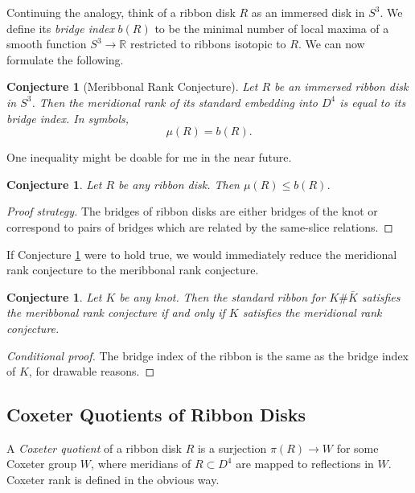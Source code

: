 \documentclass{article}
\newtheorem{conjecture}[theorem]{Conjecture}
\theoremstyle{definition}
\begin{document}
Continuing the analogy, think of a ribbon disk $R$ as an immersed disk in $S^3$. We define its \textit{bridge index} $b(R)$ to be the minimal number of local maxima of a smooth function $S^3 \rightarrow \mathbb{R}$ restricted to ribbons isotopic to $R$. We can now formulate the following.

\begin{conjecture}[Meribbonal Rank Conjecture]
Let $R$ be an immersed ribbon disk in $S^3$. Then the meridional rank of its standard embedding into $D^4$ is equal to its bridge index. In symbols, $$\mu(R) = b(R).$$
\end{conjecture}

One inequality might be doable for me in the near future.

\begin{conjecture}\label{conj:meribbonal-rank-easy}
Let $R$ be any ribbon disk. Then $\mu(R) \leq b(R)$.
\end{conjecture}

\begin{proof}[Proof strategy]
The bridges of ribbon disks are either bridges of the knot or correspond to pairs of bridges which are related by the same-slice relations.
\end{proof}

If Conjecture \ref{conj:meribbonal-rank-easy} were to hold true, we would immediately reduce the meridional rank conjecture to the meribbonal rank conjecture.

\begin{conjecture}
Let $K$ be any knot. Then the standard ribbon for $K \# \bar{K}$ satisfies the meribbonal rank conjecture if and only if $K$ satisfies the meridional rank conjecture.
\end{conjecture}

\begin{proof}[Conditional proof]
The bridge index of the ribbon is the same as the bridge index of $K$, for drawable reasons.
\end{proof}

\subsection{Coxeter Quotients of Ribbon Disks}

A \textit{Coxeter quotient} of a ribbon disk $R$ is a surjection $\pi(R) \rightarrow W$ for some Coxeter group $W$, where meridians of $R \subset D^4$ are mapped to reflections in $W$. Coxeter rank is defined in the obvious way.
\end{document}
